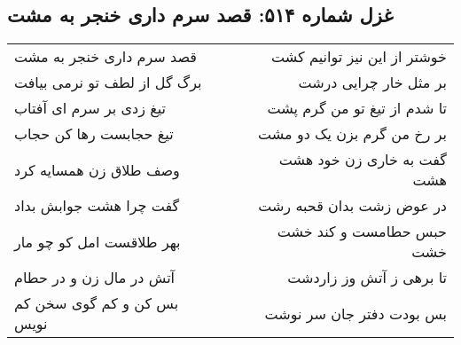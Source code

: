 \begin{center}
\section*{غزل شماره ۵۱۴: قصد سرم داری خنجر به مشت}
\label{sec:0514}
\begin{longtable}{l p{0.5cm} r}
قصد سرم داری خنجر به مشت
&&
خوشتر از این نیز توانیم کشت
\\
برگ گل از لطف تو نرمی بیافت
&&
بر مثل خار چرایی درشت
\\
تیغ زدی بر سرم ای آفتاب
&&
تا شدم از تیغ تو من گرم پشت
\\
تیغ حجابست رها کن حجاب
&&
بر رخ من گرم بزن یک دو مشت
\\
وصف طلاق زن همسایه کرد
&&
گفت به خاری زن خود هشت هشت
\\
گفت چرا هشت جوابش بداد
&&
در عوض زشت بدان قحبه رشت
\\
بهر طلاقست امل کو چو مار
&&
حبس حطامست و کند خشت خشت
\\
آتش در مال زن و در حطام
&&
تا برهی ز آتش وز زاردشت
\\
بس کن و کم گوی سخن کم نویس
&&
بس بودت دفتر جان سر نوشت
\\
\end{longtable}
\end{center}
